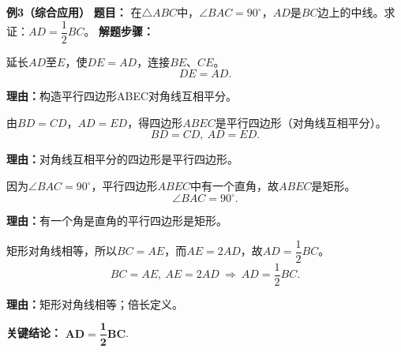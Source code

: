 \begin{examplebox}
	\medskip
	\textbf{\textcolor{CExample}{例3（综合应用）}}
	\textbf{\textcolor{CExample}{题目：}}
	在$\triangle ABC$中，$\angle BAC=90^\circ$，$AD$是$BC$边上的中线。求证：$AD=\dfrac{1}{2}BC$。
	\textbf{\textcolor{CExample}{解题步骤：}}
	\begin{description}[style=nextline, leftmargin=2.8em, labelsep=0.5em, itemsep=0.45em]
		\item[\textbf{第一步（倍长构造）：}]
			延长$AD$至$E$，使$DE=AD$，连接$BE$、$CE$。
			\[
				DE=AD.
			\]
			\par\textbf{理由：}构造平行四边形ABEC对角线互相平分。
		\item[\textbf{第二步（证平行四边形）：}]
			由$BD=CD$，$AD=ED$，得四边形$ABEC$是平行四边形（对角线互相平分）。
			\[
				BD=CD,\ AD=ED.
			\]
			\par\textbf{理由：}对角线互相平分的四边形是平行四边形。
		\item[\textbf{第三步（证矩形）：}]
			因为$\angle BAC=90^\circ$，平行四边形$ABEC$中有一个直角，故$ABEC$是矩形。
			\[
				\angle BAC=90^\circ.
			\]
			\par\textbf{理由：}有一个角是直角的平行四边形是矩形。
		\item[\textbf{第四步（得结论）：}]
			矩形对角线相等，所以$BC=AE$，而$AE=2AD$，故$AD=\dfrac{1}{2}BC$。
			\[
				BC=AE,\ AE=2AD\ \Rightarrow\ AD=\frac12 BC.
			\]
			\par\textbf{理由：}矩形对角线相等；倍长定义。
	\end{description}
	\textbf{\textcolor{CExample}{关键结论：}}
	$\mathbf{AD=\dfrac{1}{2}BC}$.
\end{examplebox}
